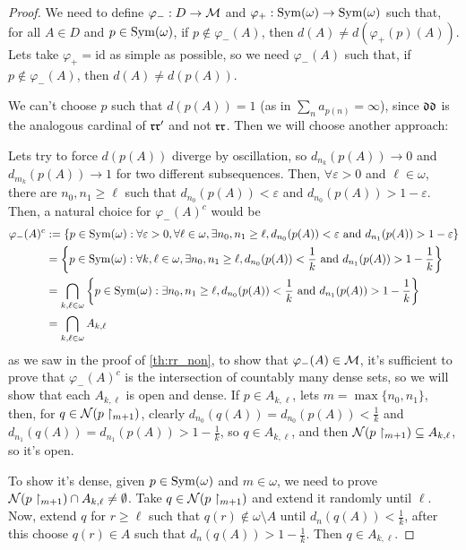 \begin{proof}
    We need to define $\varphi_-:D\to\mathcal{M}$ and $\varphi_+:\mathrm{Sym}(\omega)\to\mathrm{Sym}(\omega)$ such that, for all $A\in D$ and $p\in\mathrm{Sym}(\omega)$, if $p\notin\varphi_-(A)$, then $d(A)\neq d(\varphi_+(p)(A))$. Lets take $\varphi_+=\text{id}$ as simple as possible, so we need $\varphi_-(A)$ such that, if $p\notin\varphi_-(A)$, then $d(A)\neq d(p(A))$.

    We can't choose $p$ such that $d(p(A))=1$ (as in $\sum_na_{p(n)}=\infty$), since $\mathfrak{dd}$ is the analogous cardinal of $\mathfrak{rr}'$ and not $\mathfrak{rr}$. Then we will choose another approach:

    Lets try to force $d(p(A))$ diverge by oscillation, so $d_{n_k}(p(A))\to 0$ and $d_{m_k}(p(A))\to1$ for two different subsequences. Then, $\forall\varepsilon>0$ and $\ell\in\omega$, there are $n_0,n_1\geq\ell$ such that $d_{n_0}(p(A))<\varepsilon$ and $d_{n_0}(p(A))>1-\varepsilon$. Then, a natural choice for $\varphi_-(A)^c$ would be
    \begin{align*}
        \varphi_-(A)^c & := \left\{p\in\mathrm{Sym}(\omega):\forall\varepsilon>0,\forall\ell\in\omega,\exists n_0,n_1\geq\ell,d_{n_0}(p(A))<\varepsilon\text{ and }d_{n_1}(p(A))>1-\varepsilon\right\}\\
        & = \left\{p\in\mathrm{Sym}(\omega):\forall k,\ell\in\omega,\exists n_0,n_1\geq\ell,d_{n_0}(p(A))<\frac1k\text{ and }d_{n_1}(p(A))>1-\frac1k\right\}\\
        & = \bigcap_{k,\ell\in\omega}\left\{p\in\mathrm{Sym}(\omega):\exists n_0,n_1\geq\ell,d_{n_0}(p(A))<\frac1k\text{ and }d_{n_1}(p(A))>1-\frac1k\right\}\\
        & = \bigcap_{k,\ell\in\omega}A_{k,\ell}
    \end{align*}
    as we saw in the proof of \cref{th:rr_non}, to show that $\varphi_-(A)\in\mathcal{M}$, it's sufficient to prove that $\varphi_-(A)^c$ is the intersection of countably many dense sets, so we will show that each $A_{k,\ell}$ is open and dense. If $p\in A_{k,\ell}$, lets $m=\max\{n_0,n_1\}$, then, for $q\in\mathcal{N}(p\restriction_{m+1})$, clearly $d_{n_0}(q(A))=d_{n_0}(p(A))<\frac1k$ and $d_{n_1}(q(A))=d_{n_1}(p(A))>1-\frac1k$, so $q\in A_{k,\ell}$, and then $\mathcal{N}(p\restriction_{m+1})\subseteq A_{k,\ell}$, so it's open.

    To show it's dense, given $p\in\mathrm{Sym}(\omega)$ and $m\in\omega$, we need to prove $\mathcal{N}(p\restriction_{m+1})\cap A_{k,\ell}\neq\emptyset$. Take $q\in\mathcal{N}(p\restriction_{m+1})$ and extend it randomly until $\ell$. Now, extend $q$ for $r\geq\ell$ such that $q(r)\notin\omega\setminus A$ until $d_n(q(A))<\frac1k$, after this choose $q(r)\in A$ such that $d_n(q(A))>1-\frac1k$. Then $q\in A_{k,\ell}$.
\end{proof}

